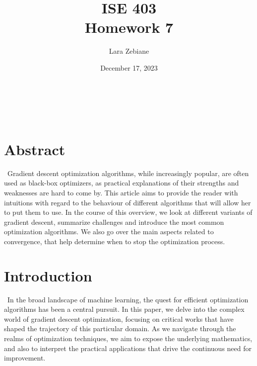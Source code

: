 \documentclass{article}
\title{ISE 403\\ Homework 7}
\author{Lara Zebiane }
\date{December 17, 2023}
\begin{document}
\maketitle

\newpage
\begin{center}
    \textbf{}\\
    \vspace{0.4 cm}
    \\
    
\end{center}
\vspace{0.5cm}
\section*{Abstract}
\
Gradient descent optimization algorithms, while increasingly popular, are often
used as black-box optimizers, as practical explanations of their strengths and
weaknesses are hard to come by. This article aims to provide the reader with
intuitions with regard to the behaviour of different algorithms that will allow her
to put them to use. In the course of this overview, we look at different variants of
gradient descent, summarize challenges and introduce the most common optimization
algorithms. We also go over the main aspects related to convergence, that help determine when to stop the optimization process.


\section*{Introduction}
\
In the broad landscape of machine learning, the quest for efficient optimization algorithms has been a central pursuit. In this paper, we delve into the complex world of gradient descent optimization, focusing on critical works that have shaped the trajectory of this particular domain. As we navigate through the realms of optimization techniques, we aim to expose the underlying mathematics, and also to interpret the practical applications that drive the continuous need for improvement.
\end{document}
